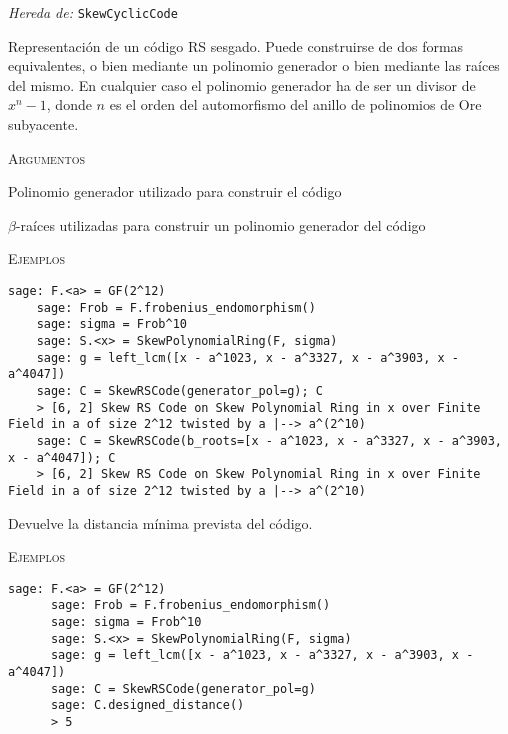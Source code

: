 \begin{description}[leftmargin=1em, font=\normalfont\ttfamily, style=nextline]
  \item[class SkewRSCode(self, generator\_pol=None, b\_roots=None)]
  
  \emph{Hereda de:} \texttt{SkewCyclicCode}

  Representación de un código RS sesgado.
  Puede construirse de dos formas equivalentes, o bien mediante un polinomio generador o bien mediante las raíces del mismo.
  En cualquier caso el polinomio generador ha de ser un divisor de \(x^n - 1\), donde \(n\) es el orden del automorfismo del anillo de polinomios de Ore subyacente.

  \textsc{Argumentos}
  \begin{description}[font=\normalfont\ttfamily]
    \item[generator\_pol] Polinomio generador utilizado para construir el código
    \item[b\_roots] \(\beta\)-raíces utilizadas para construir un polinomio generador del código 
  \end{description}

  \textsc{Ejemplos}
  \begin{lstlisting}[gobble=4]
    sage: F.<a> = GF(2^12)
    sage: Frob = F.frobenius_endomorphism()
    sage: sigma = Frob^10
    sage: S.<x> = SkewPolynomialRing(F, sigma)
    sage: g = left_lcm([x - a^1023, x - a^3327, x - a^3903, x - a^4047])
    sage: C = SkewRSCode(generator_pol=g); C
    > [6, 2] Skew RS Code on Skew Polynomial Ring in x over Finite Field in a of size 2^12 twisted by a |--> a^(2^10)
    sage: C = SkewRSCode(b_roots=[x - a^1023, x - a^3327, x - a^3903, x - a^4047]); C
    > [6, 2] Skew RS Code on Skew Polynomial Ring in x over Finite Field in a of size 2^12 twisted by a |--> a^(2^10)
  \end{lstlisting}

  \begin{description}[font=\ttfamily, style=nextline]
    \item[designed\_distance(self)] Devuelve la distancia mínima prevista del código.
    
    \textsc{Ejemplos}
    \begin{lstlisting}[gobble=6]
      sage: F.<a> = GF(2^12)
      sage: Frob = F.frobenius_endomorphism()
      sage: sigma = Frob^10
      sage: S.<x> = SkewPolynomialRing(F, sigma)
      sage: g = left_lcm([x - a^1023, x - a^3327, x - a^3903, x - a^4047])
      sage: C = SkewRSCode(generator_pol=g)
      sage: C.designed_distance()
      > 5
    \end{lstlisting}
  \end{description}
\end{description}


